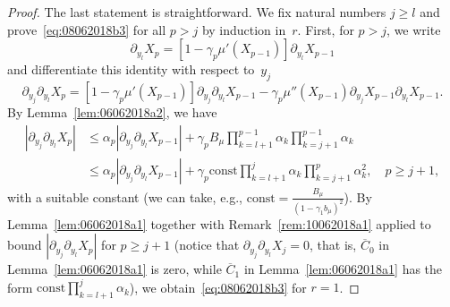 \documentclass[article]{elsarticle}
\newcommand*{\const}{\mathrm{const}}
\newcommand*{\ol}{\overline}
\begin{document}
\begin{proof}
The last statement is straightforward.
We fix natural numbers $j\ge l$ and prove~\eqref{eq:08062018b3}
for all $p>j$ by induction in~$r$.
First, for $p>j$, we write
$$
\partial_{y_{l}}X_{p}
=\left[1-\gamma_{p}\mu'(X_{p-1})\right]\partial_{y_{l}}X_{p-1}
$$
and differentiate this identity with respect to~$y_j$
$$
\partial_{y_{j}}\partial_{y_{l}}X_{p}
=\left[1-\gamma_{p}\mu'(X_{p-1})\right]\partial_{y_{j}}\partial_{y_{l}}X_{p-1}-\gamma_{p}\mu''(X_{p-1})\partial_{y_{j}}X_{p-1}\partial_{y_{l}}X_{p-1}.
$$
By Lemma~\ref{lem:06062018a2}, we have
\begin{align*}
|\partial_{y_{j}}\partial_{y_{l}}X_{p}|
&\le\alpha_p|\partial_{y_{j}}\partial_{y_{l}}X_{p-1}|
+\gamma_{p}
B_\mu
\prod_{k=l+1}^{p-1}\alpha_k
\prod_{k=j+1}^{p-1}\alpha_k\\
&\le\alpha_p|\partial_{y_{j}}\partial_{y_{l}}X_{p-1}|
+\gamma_{p}
\const
\prod_{k=l+1}^{j}\alpha_k
\prod_{k=j+1}^{p}\alpha_k^2,
\quad p\ge j+1,
\end{align*}
with a suitable constant
(we can take, e.g., $\const=\frac{B_\mu}{(1-\gamma_1 b_\mu)^2}$).
By Lemma~\ref{lem:06062018a1}
together with Remark~\ref{rem:10062018a1} applied
to bound $|\partial_{y_{j}}\partial_{y_{l}}X_{p}|$
for $p\ge j+1$
(notice that $\partial_{y_j}\partial_{y_l}X_j=0$, that is,
$\ol C_0$ in Lemma~\ref{lem:06062018a1} is zero,
while $\ol C_1$ in Lemma~\ref{lem:06062018a1}
has the form $\const\prod_{k=l+1}^j \alpha_k$),
we obtain~\eqref{eq:08062018b3} for $r=1$.


\end{proof}
\end{document}
